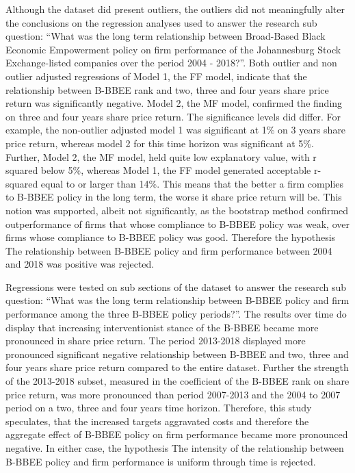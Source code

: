 Although the dataset did present outliers, the outliers did not meaningfully alter the conclusions on the regression analyses used to answer the research sub question: “What was the long term relationship between Broad-Based Black Economic Empowerment policy on firm performance of the Johannesburg Stock Exchange-listed companies over the period 2004 - 2018?”. Both outlier and non outlier adjusted regressions of Model 1, the FF model, indicate that the relationship between B-BBEE rank and two, three and four years share price return  was significantly negative. Model 2, the MF model, confirmed the finding on three and four years share price return. The significance levels did differ. For example, the non-outlier adjusted model 1 was significant at 1\% on 3 years share price return, whereas model 2 for this time horizon was significant at 5\%. Further, Model 2, the  MF model, held quite low explanatory value, with r squared below 5\%, whereas Model 1, the FF model generated acceptable r-squared equal to or larger than 14\%. This means that the better a firm complies to B-BBEE policy in the long term, the worse it share price return will be. This notion was supported, albeit not significantly, as the bootstrap method confirmed outperformance of firms that whose compliance to B-BBEE policy was weak, over firms whose compliance to B-BBEE policy was good. Therefore the hypothesis The relationship between B-BBEE policy and firm performance between 2004 and 2018 was positive was rejected.

Regressions were tested on sub sections of the dataset to answer the research sub question: “What was the long term relationship between B-BBEE policy and firm performance among the three B-BBEE policy periods?”. The results over time do display that increasing interventionist stance of the B-BBEE became more pronounced in share price return. The period 2013-2018 displayed more pronounced significant negative relationship between B-BBEE and two, three and four years share price return compared to the entire dataset. Further the strength of the 2013-2018 subset, measured in the coefficient of the B-BBEE rank on share price return, was more pronounced than period 2007-2013 and the 2004 to 2007 period on a two, three and four years time horizon. Therefore, this study speculates, that the increased targets aggravated costs and therefore the aggregate effect of B-BBEE policy on firm performance became more pronounced negative. In either case, the hypothesis The intensity of the relationship between B-BBEE policy and firm performance is uniform through time is rejected.

